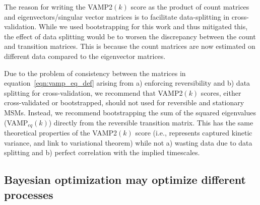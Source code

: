 \documentclass[journal=jacsat,manuscript=article]{achemso}
\begin{document}
The reason for writing the VAMP2$(k)$ score as the product of count matrices and eigenvectors/singular vector matrices is to facilitate data-splitting in cross-validation. While we used bootstrapping for this work and thus mitigated this, the effect of data splitting would be to worsen the discrepancy between the count and transition matrices. This is because the count matrices are now estimated on different data compared to the eigenvector matrices.  

Due to the problem of consistency between the matrices in equation~\ref{eqn:vamp_eq_def} arising from a) enforcing reversibility and b) data splitting for cross-validation,  we recommend that VAMP2$(k)$ scores, either cross-validated or bootstrapped, should not used for reversible and stationary MSMs. Instead, we recommend bootstrapping the sum of the squared eigenvalues (VAMP$_{eq}(k)$) directly from the reversible transition matrix. This has the same theoretical properties of the VAMP2$(k)$ score (i.e., represents captured kinetic variance, and link to variational theorem) while not a) wasting data due to data splitting and b) perfect correlation with the implied timescales.

\FloatBarrier
\clearpage

\subsection{Bayesian optimization may optimize different processes}\label{sec:bayes}
\end{document}
